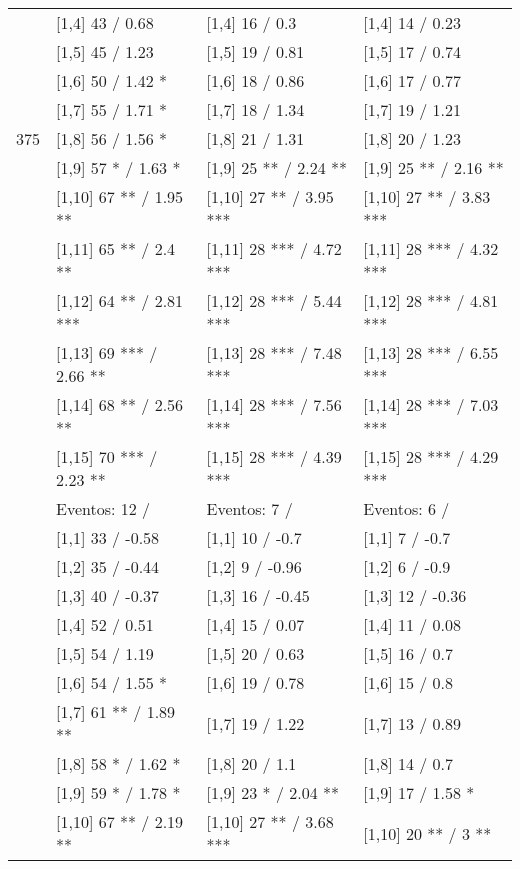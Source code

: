\begin{table}
\begin{tabular}[t]{llll}
\addlinespace
 & {}[1,4] 43  / 0.68 & {}[1,4] 16  / 0.3 & {}[1,4] 14  / 0.23\\
 & {}[1,5] 45  / 1.23 & {}[1,5] 19  / 0.81 & {}[1,5] 17  / 0.74\\
 & {}[1,6] 50  / 1.42 * & {}[1,6] 18  / 0.86 & {}[1,6] 17  / 0.77\\
 & {}[1,7] 55  / 1.71 * & {}[1,7] 18  / 1.34 & {}[1,7] 19  / 1.21\\
375 & {}[1,8] 56  / 1.56 * & {}[1,8] 21  / 1.31 & {}[1,8] 20  / 1.23\\
\addlinespace
 & {}[1,9] 57 * / 1.63 * & {}[1,9] 25 ** / 2.24 ** & {}[1,9] 25 ** / 2.16 **\\
 & {}[1,10] 67 ** / 1.95 ** & {}[1,10] 27 ** / 3.95 *** & {}[1,10] 27 ** / 3.83 ***\\
 & {}[1,11] 65 ** / 2.4 ** & {}[1,11] 28 *** / 4.72 *** & {}[1,11] 28 *** / 4.32 ***\\
 & {}[1,12] 64 ** / 2.81 *** & {}[1,12] 28 *** / 5.44 *** & {}[1,12] 28 *** / 4.81 ***\\
 & {}[1,13] 69 *** / 2.66 ** & {}[1,13] 28 *** / 7.48 *** & {}[1,13] 28 *** / 6.55 ***\\
\addlinespace
 & {}[1,14] 68 ** / 2.56 ** & {}[1,14] 28 *** / 7.56 *** & {}[1,14] 28 *** / 7.03 ***\\
 & {}[1,15] 70 *** / 2.23 ** & {}[1,15] 28 *** / 4.39 *** & {}[1,15] 28 *** / 4.29 ***\\
 & Eventos:  12 / & Eventos:  7 / & Eventos:  6 /\\
 & {}[1,1] 33  / -0.58 & {}[1,1] 10  / -0.7 & {}[1,1] 7  / -0.7\\
 & {}[1,2] 35  / -0.44 & {}[1,2] 9  / -0.96 & {}[1,2] 6  / -0.9\\
\addlinespace
 & {}[1,3] 40  / -0.37 & {}[1,3] 16  / -0.45 & {}[1,3] 12  / -0.36\\
 & {}[1,4] 52  / 0.51 & {}[1,4] 15  / 0.07 & {}[1,4] 11  / 0.08\\
 & {}[1,5] 54  / 1.19 & {}[1,5] 20  / 0.63 & {}[1,5] 16  / 0.7\\
 & {}[1,6] 54  / 1.55 * & {}[1,6] 19  / 0.78 & {}[1,6] 15  / 0.8\\
 & {}[1,7] 61 ** / 1.89 ** & {}[1,7] 19  / 1.22 & {}[1,7] 13  / 0.89\\
\addlinespace
500 & {}[1,8] 58 * / 1.62 * & {}[1,8] 20  / 1.1 & {}[1,8] 14  / 0.7\\
 & {}[1,9] 59 * / 1.78 * & {}[1,9] 23 * / 2.04 ** & {}[1,9] 17  / 1.58 *\\
 & {}[1,10] 67 ** / 2.19 ** & {}[1,10] 27 ** / 3.68 *** & {}[1,10] 20 ** / 3 **\\

\end{tabular}
\end{table}
